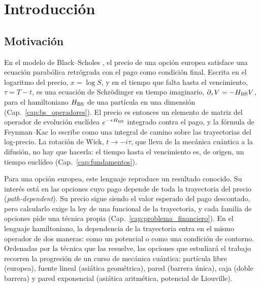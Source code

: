 \chapter{Introducción}\label{cap:intro}

\section{Motivación}
\label{sec:motivacion}

En el modelo de Black--Scholes \cite{black-scholes, merton1973}, el
precio de una opción europea satisface una ecuación parabólica
retrógrada con el pago como condición final. Escrita en el logaritmo
del precio, $x = \log S$, y en el tiempo que falta hasta el vencimiento,
$\tau = T - t$, es una ecuación de Schrödinger en tiempo imaginario,
$\partial_\tau V = -H_{\text{BS}} V$, para el hamiltoniano $H_{\text{BS}}$ de una
partícula en una dimensión (Cap.~\ref{cap:bs_operadores}\enprep). El
precio es entonces un elemento de matriz del operador de evolución
euclídea $e^{-\tau H_{\text{BS}}}$ integrado contra el pago, y la fórmula de
Feynman--Kac \cite{kac1949} lo escribe como una integral de camino
sobre las trayectorias del log-precio. La rotación de
Wick, $t \to -i\tau$, que lleva de la mecánica cuántica
a la difusión, no hay que hacerla: el tiempo hasta el vencimiento es, de
origen, un tiempo euclídeo (Cap.~\ref{cap:fundamentos}\enprep).

\medskip

Para una opción europea, este lenguaje reproduce un resultado conocido.
Su interés está en las opciones cuyo pago depende de toda la trayectoria
del precio (\emph{path-dependent}). Su precio sigue siendo el valor
esperado del pago descontado, pero calcularlo exige la ley de una
funcional de la trayectoria, y cada familia de opciones pide una técnica
propia (Cap.~\ref{cap:problema_financiero}). En el lenguaje
hamiltoniano, la dependencia de la trayectoria entra en el mismo
operador de dos maneras: como un potencial o como una condición de
contorno. Ordenadas por la técnica que las resuelve, las opciones que
estudiará el trabajo recorren la progresión de un curso de mecánica
cuántica: partícula libre (europea), fuente lineal (asiática
geométrica), pared (barrera única), caja (doble barrera) y pared
exponencial (asiática aritmética, potencial de Liouville).

\medskip


